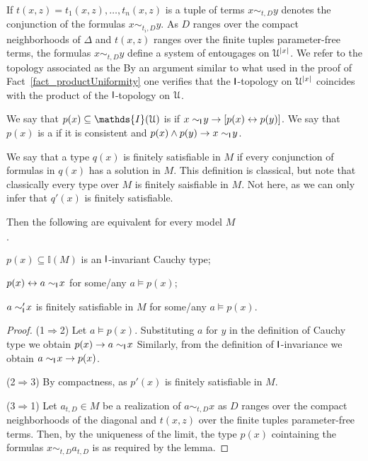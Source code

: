 \documentclass[10pt,oneside]{amsproc}
\newcommand{\mylabel}[1]{{#1}\hfill}
\renewenvironment{itemize}
  {\begin{list}{$\cdot$}{%
  \setlength{\parskip}{0mm}
  \setlength{\topsep}{.4\baselineskip}
  \setlength{\rightmargin}{0mm}
  \setlength{\listparindent}{0mm}
  \setlength{\itemindent}{0mm}
  \setlength{\labelwidth}{3ex}
  \setlength{\itemsep}{.2\baselineskip}
  \setlength{\parsep}{.2\baselineskip}
  \setlength{\partopsep}{0mm}
  \setlength{\labelsep}{1ex}
  \setlength{\leftmargin}{\labelwidth+\labelsep}
  \let\makelabel\mylabel}}{%
\end{list}}
\renewcommand*{\emph}[1]{%
   \smash{\tikz[baseline]\node[rectangle, fill=teal!25, rounded corners, inner xsep=0.5ex, inner ysep=0.2ex, anchor=base, minimum height = 2.7ex]{#1};}}
\begin{document}
If $t(x,z)=t_1(x,z),\dots,t_n(x,z)$ is a tuple of terms $x\sim_{t,D}y$ denotes the conjunction of the formulas $x\sim_{t_i,D}y$.
As $D$ ranges over the compact neighborhoods of $\Delta$ and $t(x,z)$ ranges over the finite tuples parameter-free terms, the formulas $x\sim_{t,D}y$ define a system of entougages on ${\EuScript U}^{|x|}$.
We refer to the topology associated as the \emph{${\sf I}$-topology.}
By an argument similar to what used in the proof of Fact~\ref{fact_productUniformity} one verifies that the ${\sf I}$-topology on ${\EuScript U}^{|x|}$ coincides with the product of the ${\sf I}$-topology on ${\EuScript U}$.

We say that $p(x)\subseteq\mathds{I}({\EuScript U})$ is \emph{${\sf I}$-invariant\/} if $x\sim_{\sf I}\!y\rightarrow[p(x)\leftrightarrow p(y)]$.
We say that $p(x)$ is a \emph{Cauchy type\/} if it is consistent and $p(x)\wedge p(y)\rightarrow x\sim_{\sf I}\!y$.

We say that a type $q(x)$ is finitely satisfiable in $M$ if every conjunction of formulas in $q(x)$ has a solution in $M$.
This definition is classical, but note that classically every type over $M$ is finitely saisfiable in $M$. 
Not here, as we can only infer that $q'(x)$ is finitely satisfiable.

\begin{lemma}
  Then the following are equivalent for every model $M$
  \begin{itemize}
    \item[1.]  $p(x)\subseteq\mathds{I}(M)$ is an ${\sf I}$-invariant Cauchy type;
    \item[2.] $p(x)\leftrightarrow a\sim_{\sf I}\!x$ for some/any $a\models p(x)$;
    \item[3.] $a\sim'_{\sf I}\!x$ is finitely satisfiable in $M$ for some/any $a\models p(x)$.
  \end{itemize}
\end{lemma}

\begin{proof}
  (1$\Rightarrow$2)
  Let $a\models p(x)$.
  Substituting $a$ for $y$ in the definition of Cauchy type we obtain $p(x)\rightarrow a\sim_{\sf I}\!x$
  Similarly, from the definition of ${\sf I}$-invariance we obtain $a\sim_{\sf I}\!x\rightarrow p(x)$.

  (2$\Rightarrow$3) 
  By compactness, as $p'(x)$ is finitely satisfiable in $M$.

  (3$\Rightarrow$1)  
  Let $a_{t,D}\in M$ be a realization of $a\sim_{t,D}x$ as $D$ ranges over the compact neighborhoods of the diagonal and $t(x,z)$ over the finite tuples parameter-free terms.
  Then, by the uniqueness of the limit, the type $p(x)$ cointaining the formulas $x\sim_{t,D}a_{t,D}$ is as required by the lemma.
\end{proof}
\end{document}
